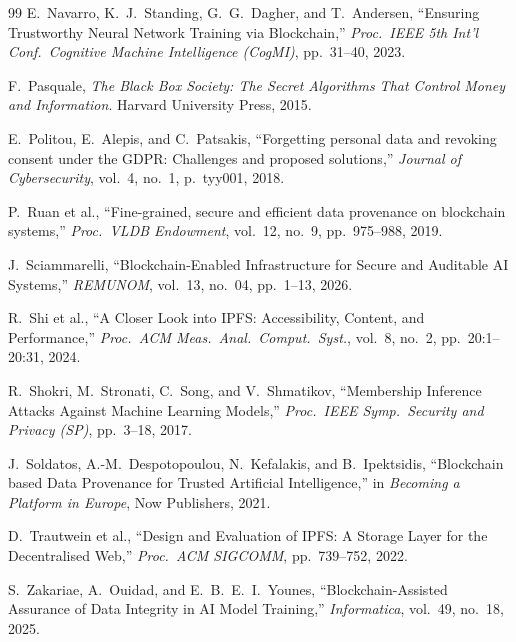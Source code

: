 \documentclass[10pt,twocolumn]{article}
\begin{document}
{\begin{thebibliography}{99}
E.~Navarro, K.~J.~Standing, G.~G.~Dagher, and T.~Andersen,
``Ensuring Trustworthy Neural Network Training via Blockchain,''
\textit{Proc.\ IEEE 5th Int'l Conf.\ Cognitive Machine Intelligence (CogMI)},
pp.\ 31--40, 2023.

F.~Pasquale,
\textit{The Black Box Society: The Secret Algorithms That Control Money and Information}.
Harvard University Press, 2015.

E.~Politou, E.~Alepis, and C.~Patsakis,
``Forgetting personal data and revoking consent under the GDPR: Challenges and proposed solutions,''
\textit{Journal of Cybersecurity}, vol.~4, no.~1, p.~tyy001, 2018.

P.~Ruan et al.,
``Fine-grained, secure and efficient data provenance on blockchain systems,''
\textit{Proc.\ VLDB Endowment}, vol.~12, no.~9, pp.\ 975--988, 2019.

J.~Sciammarelli,
``Blockchain-Enabled Infrastructure for Secure and Auditable AI Systems,''
\textit{REMUNOM}, vol.~13, no.~04, pp.\ 1--13, 2026.

R.~Shi et al.,
``A Closer Look into IPFS: Accessibility, Content, and Performance,''
\textit{Proc.\ ACM Meas.\ Anal.\ Comput.\ Syst.}, vol.~8, no.~2, pp.\ 20:1--20:31, 2024.

R.~Shokri, M.~Stronati, C.~Song, and V.~Shmatikov,
``Membership Inference Attacks Against Machine Learning Models,''
\textit{Proc.\ IEEE Symp.\ Security and Privacy (SP)}, pp.\ 3--18, 2017.

J.~Soldatos, A.-M.~Despotopoulou, N.~Kefalakis, and B.~Ipektsidis,
``Blockchain based Data Provenance for Trusted Artificial Intelligence,''
in \textit{Becoming a Platform in Europe}, Now Publishers, 2021.

D.~Trautwein et al.,
``Design and Evaluation of IPFS: A Storage Layer for the Decentralised Web,''
\textit{Proc.\ ACM SIGCOMM}, pp.\ 739--752, 2022.

S.~Zakariae, A.~Ouidad, and E.~B.~E.~I.~Younes,
``Blockchain-Assisted Assurance of Data Integrity in AI Model Training,''
\textit{Informatica}, vol.~49, no.~18, 2025.

\end{thebibliography}
}
\end{document}
